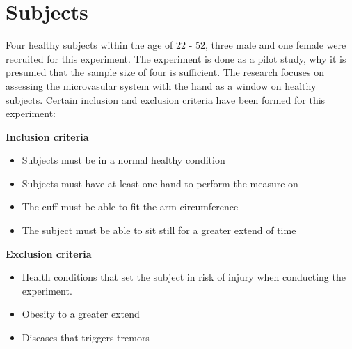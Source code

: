\section{Subjects}

Four healthy subjects within the age of 22 - 52, three male and one female were recruited for this experiment. The experiment is done as a pilot study, why it is presumed that the sample size of four is sufficient. The research focuses on assessing the microvasular system with the hand as a window on healthy subjects. Certain inclusion and exclusion criteria have been formed for this experiment:

\textbf{Inclusion criteria}
\begin{itemize}[noitemsep]
	\item Subjects must be in a normal healthy condition 
	\item Subjects must have at least one hand to perform the measure on
	\item The cuff must be able to fit the arm circumference 
	\item The subject must be able to sit still for a greater extend of time
\end{itemize}

\textbf{Exclusion criteria}
\begin{itemize}[noitemsep]
	\item Health conditions that set the subject in risk of injury when conducting the experiment.
	
	\item Obesity to a greater extend
	\item Diseases that triggers tremors   
\end{itemize} 
